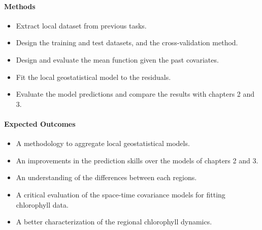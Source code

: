 \paragraph{Methods}

\begin{itemize}

\item Extract local dataset from previous tasks.

\item Design the training and test datasets, and the cross-validation method.

\item Design and evaluate the mean function given the past covariates.

\item Fit the local geostatistical model to the residuals.

\item Evaluate the model predictions and compare the results with chapters 2 and 3.

\end{itemize}

\paragraph{Expected Outcomes}

\begin{itemize}

\item A methodology to aggregate local geostatistical models.

\item An improvements in the prediction skills over the models of chapters 2 and 3.

\item An understanding of the differences between each regions.

\item A critical evaluation of the space-time covariance models for fitting
chlorophyll data.

\item A better characterization of the regional chlorophyll dynamics.

\end{itemize}
